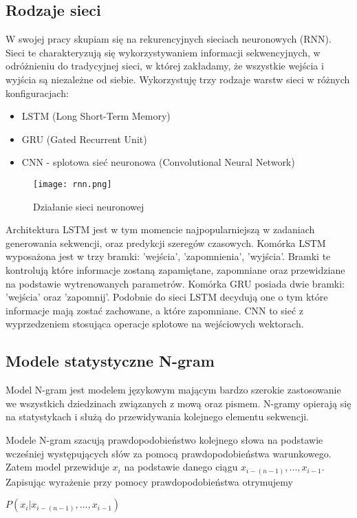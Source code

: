 \subsection {Rodzaje sieci}
W swojej pracy skupiam się na rekurencyjnych sieciach neuronowych (RNN). Sieci te charakteryzują się wykorzystywaniem informacji 
sekwencyjnych, w odróżnieniu do tradycyjnej sieci, w której zakładamy, że wszystkie wejścia i wyjścia są niezależne od siebie. Wykorzystuję
trzy rodzaje warstw sieci w różnych konfiguracjach: 
\begin{itemize}
    \item LSTM (Long Short-Term Memory)
    \item GRU (Gated Recurrent Unit)
    \item CNN - splotowa sieć neuronowa (Convolutional Neural Network)
\end{itemize}
\begin{figure}[!h]
	\caption{Działanie sieci neuronowej}
    \label{fig:rnn}
    \centering \texttt{[image: rnn.png]}
\end{figure}
Architektura LSTM jest w tym momencie najpopularniejszą w zadaniach generowania sekwencji, oraz predykcji szeregów czasowych. Komórka LSTM 
wyposażona jest w trzy bramki: 'wejścia',  'zapomnienia', 'wyjścia'. Bramki te kontrolują które informacje zostaną zapamiętane, zapomniane
oraz przewidziane na podstawie wytrenowanych parametrów. Komórka GRU posiada dwie bramki: 'wejścia' oraz 'zapomnij'. Podobnie do sieci LSTM 
decydują one o tym które informacje mają zostać zachowane, a które zapomniane. CNN to sieć z wyprzedzeniem stosująca operacje splotowe na wejściowych 
wektorach. 

\subsection{Modele statystyczne N-gram}
Model N-gram jest modelem językowym mającym bardzo szerokie zastosowanie we wszystkich dziedzinach związanych z mową oraz pismem. 
N-gramy opierają się na statystykach i służą do przewidywania kolejnego elementu sekwencji.

Modele N-gram szacują prawdopodobieństwo kolejnego słowa na podstawie wcześniej występujących słów za pomocą
prawdopodobieństwa warunkowego. Zatem model przewiduje \begin{math}x_i\end{math} na podstawie danego ciągu 
\begin{math}x_{i-(n-1)},...,x_{i-1}\end{math}. Zapisując wyrażenie przy pomocy prawdopodobieństwa otrymujemy \\
\centerline{\begin{math}P(x_i|x_{i-(n-1)},...,x_{i-1})\end{math}}


